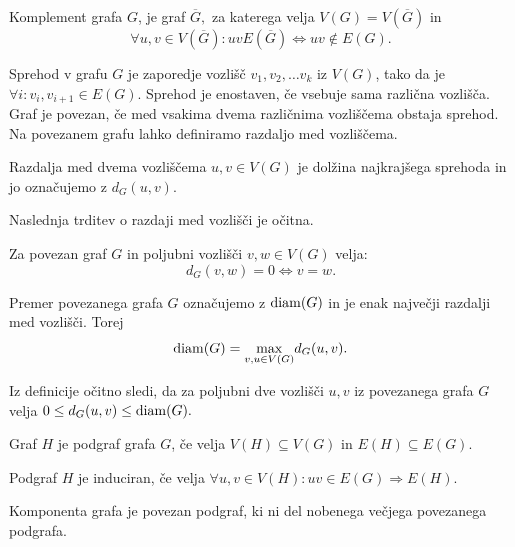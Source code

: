 \documentclass[mat1, tisk]{fmfdelo}
\newcommand{\1}{(1, 1, \ldots, 1)}
\newcommand{\2}{(2, 2, \ldots, 2)}
\begin{document}
\begin{definicija} \label{def:komplement}
    Komplement grafa $G$, je graf $\overline{G},$ za katerega velja $V(G) = V(\overline{G})$ in 
    $$\forall u,v \in V(\overline{G}): uv E(\overline{G}) \Leftrightarrow uv \not \in E(G).$$
\end{definicija}

Sprehod v grafu $G$ je zaporedje vozlišč $v_1, v_2, \ldots v_k$ iz $V(G)$, tako da je 
$\forall i : v_i, v_{i+1} \in E(G).$ Sprehod je enostaven, če vsebuje sama različna vozlišča.
Graf je povezan, če med vsakima dvema različnima vozliščema obstaja sprehod. Na povezanem
grafu lahko definiramo razdaljo med vozliščema.

\begin{definicija} \label{def:razdalja}
    Razdalja med dvema vozliščema $u, v \in V(G)$ je dolžina najkrajšega sprehoda in jo 
    označujemo z $d_{G}(u, v).$ 
\end{definicija}

Naslednja trditev o razdaji med vozlišči je očitna.

\begin{trditev} \label{trd:nicelna_razdalja}
    Za povezan graf $G$ in poljubni vozlišči $v, w \in V(G)$ velja:
    $$ d_{G}(v, w) = 0 \Leftrightarrow v=w.$$
\end{trditev} 

\begin{definicija} \label{def:premer}
    Premer povezanega grafa $G$ označujemo z ${\rm diam}(G)$ in je enak največji razdalji med vozlišči.
    Torej $${\rm diam}(G) = \underset{v, u \in V(G)}{\max} d_{G}(u, v).$$
\end{definicija}

Iz definicije očitno sledi, da za poljubni dve vozlišči $u, v$ iz povezanega grafa $G$
velja $0 \leq d_G (u, v) \leq {\rm diam}(G).$

\begin{definicija} \label{def:podgraf}
    Graf $H$ je podgraf grafa $G$, če velja $V(H) \subseteq V(G)$ in 
    $E(H) \subseteq E(G)$.

    Podgraf $H$ je induciran, če velja 
    $\forall u, v \in V(H) : uv \in E(G) \Rightarrow E(H)$.
\end{definicija}

\begin{definicija} \label{def:komponenta}
Komponenta grafa je povezan podgraf, ki ni del nobenega večjega povezanega podgrafa. 
\end{definicija}
\end{document}
